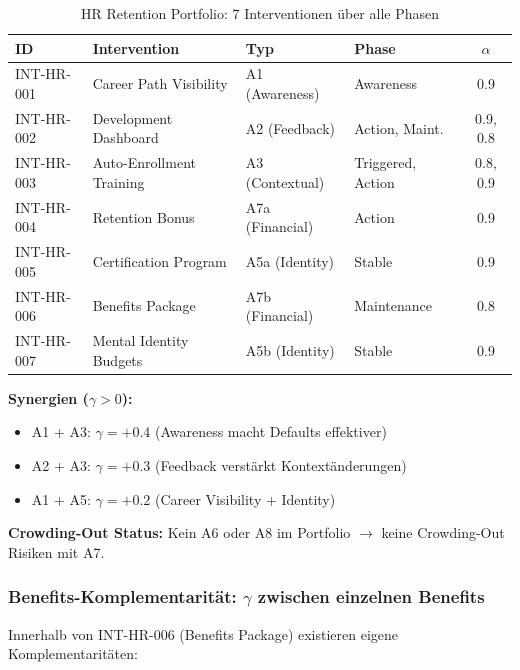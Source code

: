 \begin{table}[htbp]
\centering
\caption{HR Retention Portfolio: 7 Interventionen über alle Phasen}
\label{tab:20-hr-retention}
\renewcommand{\arraystretch}{1.3}
\small
\begin{tabular}{@{}llllc@{}}
\toprule
\textbf{ID} & \textbf{Intervention} & \textbf{Typ} & \textbf{Phase} & \textbf{$\alpha$} \\
\midrule
INT-HR-001 & Career Path Visibility & A1 (Awareness) & Awareness & 0.9 \\
INT-HR-002 & Development Dashboard & A2 (Feedback) & Action, Maint. & 0.9, 0.8 \\
INT-HR-003 & Auto-Enrollment Training & A3 (Contextual) & Triggered, Action & 0.8, 0.9 \\
INT-HR-004 & Retention Bonus & A7a (Financial) & Action & 0.9 \\
INT-HR-005 & Certification Program & A5a (Identity) & Stable & 0.9 \\
INT-HR-006 & Benefits Package & A7b (Financial) & Maintenance & 0.8 \\
INT-HR-007 & Mental Identity Budgets & A5b (Identity) & Stable & 0.9 \\
\bottomrule
\end{tabular}
\end{table}

\textbf{Synergien ($\gamma > 0$):}
\begin{itemize}[nosep]
\item A1 + A3: $\gamma = +0.4$ (Awareness macht Defaults effektiver)
\item A2 + A3: $\gamma = +0.3$ (Feedback verstärkt Kontextänderungen)
\item A1 + A5: $\gamma = +0.2$ (Career Visibility + Identity)
\end{itemize}

\textbf{Crowding-Out Status:} Kein A6 oder A8 im Portfolio $\rightarrow$ keine Crowding-Out Risiken mit A7.

\subsubsection{Benefits-Komplementarität: $\gamma$ zwischen einzelnen Benefits}

Innerhalb von INT-HR-006 (Benefits Package) existieren eigene Komplementaritäten:

